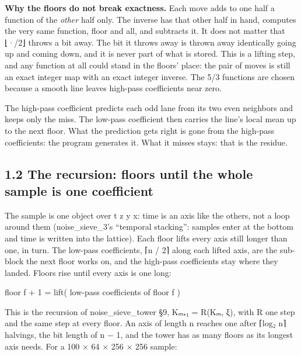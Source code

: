 \textbf{Why the floors do not break exactness.} Each move adds to one half a function of the \emph{other} half only. The inverse has that other half in hand, computes the very same function, floor and all, and subtracts it. It does not matter that ⌊·/2⌋ throws a bit away. The bit it throws away is thrown away identically going up and coming down, and it is never part of what is stored. This is a lifting step, and any function at all could stand in the floors' place: the pair of moves is still an exact integer map with an exact integer inverse. The 5/3 functions are chosen because a smooth line leaves high-pass coefficients near zero.

The high-pass coefficient predicts each odd lane from its two even neighbors and keeps only the miss. The low-pass coefficient then carries the line's local mean up to the next floor. What the prediction gets right is gone from the high-pass coefficients: the program generates it. What it misses stays: that is the residue.

\subsection{\texorpdfstring{1.2 The recursion: floors until the whole sample is one coefficient}{1.2 The recursion: floors until the whole sample is one coefficient}}

The sample is one object over t z y x: time is an axis like the others, not a loop around them (noise\_\allowbreak{}sieve\_\allowbreak{}3's “temporal stacking”: samples enter at the bottom and time is written into the lattice). Each floor lifts every axis still longer than one, in turn. The low-pass coefficients, ⌈n / 2⌉ along each lifted axis, are the sub-block the next floor works on, and the high-pass coefficients stay where they landed. Floors rise until every axis is one long:

floor f + 1  =  lift( low-pass coefficients of floor f )

This is the recursion of noise\_\allowbreak{}sieve\_\allowbreak{}tower §9, Kₘ₊₁ = R(Kₘ, ξ), with R one step and the same step at every floor. An axis of length n reaches one after ⌈log₂ n⌉ halvings, the bit length of n − 1, and the tower has as many floors as its longest axis needs. For a 100 × 64 × 256 × 256 sample:

